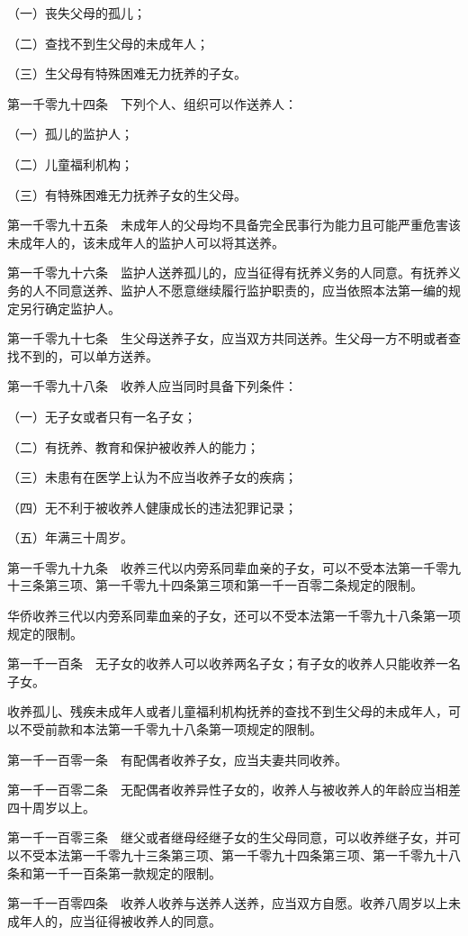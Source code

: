 \documentclass[UTF8,12pt,a4paper]{ctexbook}
\begin{document}
（一）丧失父母的孤儿；

（二）查找不到生父母的未成年人；

（三）生父母有特殊困难无力抚养的子女。

第一千零九十四条　下列个人、组织可以作送养人：

（一）孤儿的监护人；

（二）儿童福利机构；

（三）有特殊困难无力抚养子女的生父母。

第一千零九十五条　未成年人的父母均不具备完全民事行为能力且可能严重危害该未成年人的，该未成年人的监护人可以将其送养。

第一千零九十六条　监护人送养孤儿的，应当征得有抚养义务的人同意。有抚养义务的人不同意送养、监护人不愿意继续履行监护职责的，应当依照本法第一编的规定另行确定监护人。

第一千零九十七条　生父母送养子女，应当双方共同送养。生父母一方不明或者查找不到的，可以单方送养。

第一千零九十八条　收养人应当同时具备下列条件：

（一）无子女或者只有一名子女；

（二）有抚养、教育和保护被收养人的能力；

（三）未患有在医学上认为不应当收养子女的疾病；

（四）无不利于被收养人健康成长的违法犯罪记录；

（五）年满三十周岁。

第一千零九十九条　收养三代以内旁系同辈血亲的子女，可以不受本法第一千零九十三条第三项、第一千零九十四条第三项和第一千一百零二条规定的限制。

华侨收养三代以内旁系同辈血亲的子女，还可以不受本法第一千零九十八条第一项规定的限制。

第一千一百条　无子女的收养人可以收养两名子女；有子女的收养人只能收养一名子女。

收养孤儿、残疾未成年人或者儿童福利机构抚养的查找不到生父母的未成年人，可以不受前款和本法第一千零九十八条第一项规定的限制。

第一千一百零一条　有配偶者收养子女，应当夫妻共同收养。

第一千一百零二条　无配偶者收养异性子女的，收养人与被收养人的年龄应当相差四十周岁以上。

第一千一百零三条　继父或者继母经继子女的生父母同意，可以收养继子女，并可以不受本法第一千零九十三条第三项、第一千零九十四条第三项、第一千零九十八条和第一千一百条第一款规定的限制。

第一千一百零四条　收养人收养与送养人送养，应当双方自愿。收养八周岁以上未成年人的，应当征得被收养人的同意。
\end{document}
